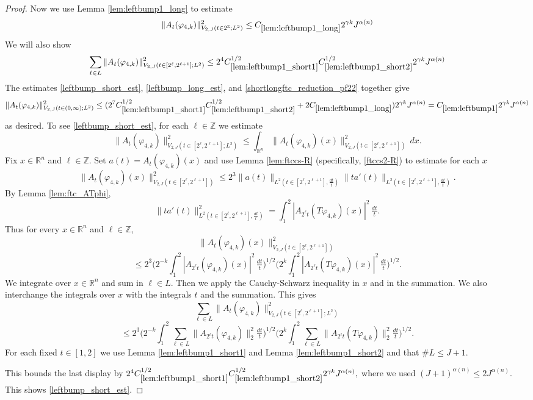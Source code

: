 \documentclass[12pt,reqno]{amsart}
\theoremstyle{plain}
\numberwithin{equation}{section}
\theoremstyle{remark}
\begin{document}
\begin{proof}
 Now we use Lemma \ref{lem:leftbump1_long} to estimate
 \begin{equation}
     \label{leftbump_long_est}
     \|A_{t}(\varphi_{4,k})\|^2_{V_{2,J}(t\in 2^\mathbb{Z}; L^2)} \le C_{\ref{lem:leftbump1_long}} 2^{\gamma k}J^{\alpha(n)}
 \end{equation}
We will also show
\begin{equation}
    \label{leftbump_short_est}
    \sum_{\ell \in L} \|A_t(\varphi_{4,k})\|_{V_{2,J}(t\in [2^\ell, 2^{\ell+1}]; L^2)}^2 \le2^4C_{\ref{lem:leftbump1_short1}}^{1/2}C_{\ref{lem:leftbump1_short2}}^{1/2}2^{\gamma k}J^{\alpha(n)}
\end{equation}
The estimates \eqref{leftbump_short_est}, \eqref{leftbump_long_est}, and \eqref{shortlongftc_reduction_pf22} together give
\[\|A_{t}(\varphi_{4,k})\|_{V_{2,J}(t\in(0,\infty);L^2)}^2  \le (2^7C_{\ref{lem:leftbump1_short1}}^{1/2} C_{\ref{lem:leftbump1_short2}}^{1/2}  + 2C_{\ref{lem:leftbump1_long}}) 2^{\gamma k} J^{\alpha(n)} = C_{\ref{lem:leftbump1}} 2^{\gamma k} J^{\alpha(n)}  \]
as desired.
To see \eqref{leftbump_short_est},
for each $\ell\in\mathbb{Z}$ we estimate
\[ \|A_t(\varphi_{4,k})\|_{V_{2,J}(t\in [2^\ell, 2^{\ell+1}]; L^2)}^2 \le \int_{\mathbb{R}^n}  \|A_t(\varphi_{4,k})(x)\|_{V_{2,J}(t\in [2^\ell, 2^{\ell+1}])}^2\, dx.\]
Fix $x\in\mathbb{R}^n$ and $\ell\in\mathbb{Z}$. Set $a(t)=A_t(\varphi_{4,k})(x)$ and use Lemma \ref{lem:ftccs-R} (specifically, \eqref{ftccs2-R}) to estimate for each $x$
\[ \|A_t(\varphi_{4,k})(x)\|_{V_{2,J}(t\in [2^\ell, 2^{\ell+1}])}^2 \le  2^3
\|a(t)\|_{L^2(t\in [2^\ell, 2^{\ell+1}],\tfrac{dt}{t})} \|ta'(t)\|_{L^2(t\in [2^\ell, 2^{\ell+1}],\tfrac{dt}{t})}.  \]
By Lemma \ref{lem:ftc_ATphi},
\[ \|ta'(t)\|_{L^2(t\in [2^\ell, 2^{\ell+1}],\tfrac{dt}{t})}^2 = \int_{1}^2 |A_{2^\ell t}(T\varphi_{4,k})(x)|^2\,\tfrac{dt}{t}. \]
Thus for every $x\in\mathbb{R}^n$ and $\ell\in\mathbb{Z}$,
\[ \|A_t(\varphi_{4,k})(x)\|_{V_{2,J}(t\in [2^\ell, 2^{\ell+1}])}^2\]
\[ \le 2^3 \Big( 2^{-k} \int_{1}^2 |A_{2^\ell t}(\varphi_{4,k})(x)|^2\,\tfrac{dt}{t} \Big)^{1/2} \Big( 2^{k}  \int_{1}^2 |A_{2^\ell t}(T{\varphi_{4,k}})(x)|^2\,\tfrac{dt}{t} \Big)^{1/2}.  \]
We integrate over $x\in\mathbb{R}^n$ and sum in $\ell\in L$.  Then we apply the Cauchy-Schwarz inequality in $x$ and in the summation.   We also interchange the integrals over $x$ with the integrals $t$ and the summation. This gives
\[ \sum_{\ell \in L}\|A_t(\varphi_{4,k})\|_{V_{2,J}(t\in [2^\ell, 2^{\ell+1}]; L^2)}^2 \]
\[\le2^3\Big( 2^{-k} \int_1^2 \sum_{\ell\in L}\|A_{2^\ell t}(\varphi_{4,k})\|_2^2 \tfrac{dt}{t} \Big)^{1/2}\Big( 2^k \int_1^2 \sum_{\ell \in L}\|A_{2^\ell t}(T\varphi_{4,k})\|_2^2 \tfrac{dt}{t} \Big)^{1/2}   . \]
For each fixed $t\in [1,2]$ we use Lemma \ref{lem:leftbump1_short1} and Lemma \ref{lem:leftbump1_short2} and that $\#L\le J+1$.

This bounds the last display by
$2^4C_{\ref{lem:leftbump1_short1}}^{1/2}C_{\ref{lem:leftbump1_short2}}^{1/2}2^{\gamma k}J^{\alpha(n)},$
where we used $(J+1)^{\alpha(n)}\le2J^{\alpha(n)}$. This shows \eqref{leftbump_short_est}.
\end{proof}
\end{document}
